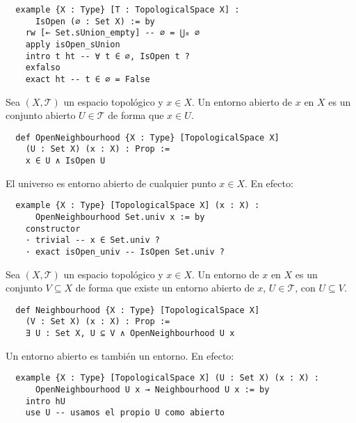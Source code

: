 \begin{lstlisting}
  example {X : Type} [T : TopologicalSpace X] :
      IsOpen (∅ : Set X) := by
    rw [← Set.sUnion_empty] -- ∅ = ⋃₀ ∅
    apply isOpen_sUnion
    intro t ht -- ∀ t ∈ ∅, IsOpen t ?
    exfalso
    exact ht -- t ∈ ∅ = False
\end{lstlisting}
  
\begin{definition}
  Sea $(X, \mathcal{T})$ un espacio topológico y $x \in X$. Un \textnormal{entorno abierto} de $x$ en $X$ es un conjunto abierto $U \in \mathcal{T}$ de forma que $x \in U$.
\end{definition}

\begin{lstlisting}
  def OpenNeighbourhood {X : Type} [TopologicalSpace X]
    (U : Set X) (x : X) : Prop :=
    x ∈ U ∧ IsOpen U
\end{lstlisting}

\begin{example}
  El universo es entorno abierto de cualquier punto $x \in X$. En efecto:
\end{example}

\begin{lstlisting}
  example {X : Type} [TopologicalSpace X] (x : X) :
      OpenNeighbourhood Set.univ x := by
    constructor
    · trivial -- x ∈ Set.univ ?
    · exact isOpen_univ -- IsOpen Set.univ ? \end{lstlisting}

\begin{definition}
  Sea $(X, \mathcal{T})$ un espacio topológico y $x \in X$. Un \textnormal{entorno} de $x$ en $X$ es un conjunto $V \subseteq X$ de forma que existe un entorno abierto de $x$, $U \in \mathcal{T}$, con $U \subseteq V$.
\end{definition}

\begin{lstlisting}
  def Neighbourhood {X : Type} [TopologicalSpace X]
    (V : Set X) (x : X) : Prop :=
    ∃ U : Set X, U ⊆ V ∧ OpenNeighbourhood U x
\end{lstlisting}

\begin{example}
  Un entorno abierto es también un entorno. En efecto:
\end{example}

\begin{lstlisting}
  example {X : Type} [TopologicalSpace X] (U : Set X) (x : X) :
      OpenNeighbourhood U x → Neighbourhood U x := by
    intro hU
    use U -- usamos el propio U como abierto
\end{lstlisting}

